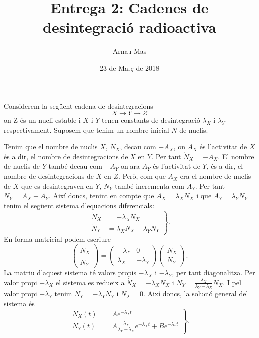 \documentclass[12pt,a4paper]{article}
\title{\textsf{\textbf{Entrega 2}: Cadenes de desintegració radioactiva}}
\author{\textsf{Arnau Mas}}
\date{\textsf{23 de Març de 2018}}
\begin{document}
\maketitle
Considerem la següent cadena de desintegracions
\begin{equation*}
	X \to Y \to Z
\end{equation*}
on Z és un nucli estable i \( X \) i \( Y \) tenen constants de desintegració \( \lambda_X \) i \( \lambda_Y \) respectivament. Suposem que tenim un nombre inicial \( N \) de nuclis.

Tenim que el nombre de nuclis \( X \), \( N_X \), decau com \( -A_X \), on \( A_X \) és l'activitat de \( X \) és a dir, el nombre de desintegracions de \( X \) en \( Y \). Per tant \( \dot{N}_X = -A_X \). El nombre de nuclis de \( Y \)   també decau com \( -A_Y \) on ara \( A_Y \) és l'activitat de \( Y \), és a dir, el nombre de desintegracions de \( X \) en \( Z \). Però, com que \( A_X \) era el nombre de nuclis de \( X \) que es desintegraven en \( Y \), \( N_Y \) també incrementa com \( A_Y \). Per tant \( \dot{N}_Y = A_X - A_Y \). Així doncs, tenint en compte que \( A_X = \lambda_X N_X \) i que \( A_Y = \lambda_Y N_Y \) tenim el següent sistema d'equacions diferencials:
\begin{equation} \label{eq:eqs diferencials}
	\left.
		\begin{aligned}
			\dot{N}_X &= -\lambda_X N_X \\
			\dot{N}_Y & = \lambda_X N_X - \lambda_Y N_Y
		\end{aligned}	
	\right\}.
\end{equation}
En forma matricial podem escriure
\begin{equation} \label{eq:eqs diferencials matriu}
	\begin{pmatrix}
		\dot{N}_X \\
		\dot{N}_Y 
	\end{pmatrix}
	=
	\begin{pmatrix}
		- \lambda_X & 0 \\
		\lambda_X & -\lambda_Y 
	\end{pmatrix}
	\begin{pmatrix}
		N_X \\
		N_Y
	\end{pmatrix}.
\end{equation}
La matriu d'aquest sistema té valors propis \( -\lambda_X \) i \( -\lambda_Y \), per tant diagonalitza. Per valor propi \( -\lambda_X \) el sistema es redueix a \( \dot{N}_X = -\lambda_X N_X \) i \( N_Y = \frac{\lambda_X}{\lambda_Y - \lambda_X} N_X \). I pel valor propi \( -\lambda_Y \) tenim \( \dot{N}_Y = -\lambda_Y N_Y \) i \( N_X = 0 \). Així doncs, la solució general del sistema és 
\begin{equation} \label{eq:sol general}
\left.
	\begin{aligned}
		N_X(t) & = Ae^{-\lambda_X t} \\
		N_Y(t) & = A\frac{\lambda_X}{\lambda_Y - \lambda_X}e^{-\lambda_X t} + Be^{-\lambda_Y t}
	\end{aligned}
\right\}.
\end{equation}
\end{document}
